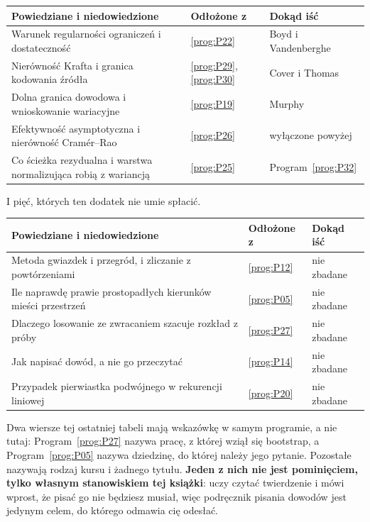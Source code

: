 \begin{center}
\begin{tabularx}{\linewidth}{@{}Xll@{}}
\toprule
\textbf{Powiedziane i niedowiedzione} & \textbf{Odłożone z}
  & \textbf{Dokąd iść} \\
\midrule
Warunek regularności ograniczeń i dostateczność &
  \ref{prog:P22} & Boyd i Vandenberghe \\
Nierówność Krafta i granica kodowania źródła &
  \ref{prog:P29}, \ref{prog:P30} & Cover i Thomas \\
Dolna granica dowodowa i wnioskowanie wariacyjne &
  \ref{prog:P19} & Murphy \\
Efektywność asymptotyczna i nierówność Cramér--Rao &
  \ref{prog:P26} & wyłączone powyżej \\
Co ścieżka rezydualna i warstwa normalizująca robią z wariancją &
  \ref{prog:P25} & Program~\ref{prog:P32} \\
\bottomrule
\end{tabularx}
\end{center}

\medskip
I pięć, których ten dodatek nie umie spłacić.

\begin{center}
\begin{tabularx}{\linewidth}{@{}Xll@{}}
\toprule
\textbf{Powiedziane i niedowiedzione} & \textbf{Odłożone z}
  & \textbf{Dokąd iść} \\
\midrule
Metoda gwiazdek i przegród, i zliczanie z powtórzeniami &
  \ref{prog:P12} & nie zbadane \\
Ile naprawdę prawie prostopadłych kierunków mieści przestrzeń &
  \ref{prog:P05} & nie zbadane \\
Dlaczego losowanie ze zwracaniem szacuje rozkład z próby &
  \ref{prog:P27} & nie zbadane \\
Jak napisać dowód, a nie go przeczytać &
  \ref{prog:P14} & nie zbadane \\
Przypadek pierwiastka podwójnego w rekurencji liniowej &
  \ref{prog:P20} & nie zbadane \\
\bottomrule
\end{tabularx}
\end{center}

\medskip
Dwa wiersze tej ostatniej tabeli mają wskazówkę w samym programie, a nie
tutaj: Program~\ref{prog:P27} nazywa pracę, z której wziął się bootstrap, a
Program~\ref{prog:P05} nazywa dziedzinę, do której należy jego pytanie.
Pozostałe nazywają rodzaj kursu i żadnego tytułu. \textbf{Jeden z nich nie jest
pominięciem, tylko własnym stanowiskiem tej książki}: uczy czytać twierdzenie i
mówi wprost, że pisać go nie będziesz musiał, więc podręcznik pisania dowodów
jest jedynym celem, do którego odmawia cię odesłać.

